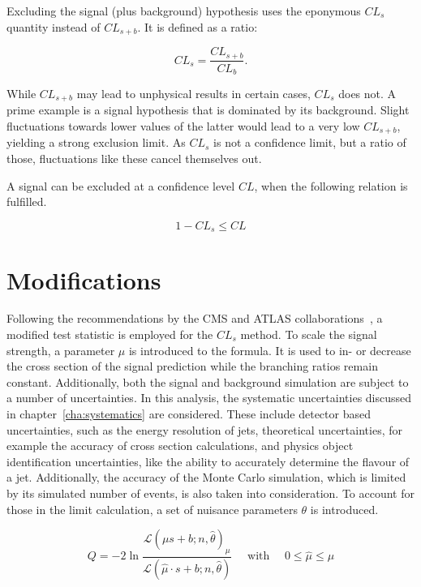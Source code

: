 Excluding the signal (plus background) hypothesis uses the eponymous $CL_s$ quantity instead of $CL_{s+b}$. It is defined as a ratio:

\begin{equation}
  \label{eq:cls}
  CL_s = \frac{CL_{s+b}}{CL_b}.
\end{equation}

\noindent While $CL_{s+b}$ may lead to unphysical results in certain cases, $CL_s$ does not. A prime example is a signal hypothesis that is dominated by its background. Slight fluctuations towards lower values of the latter would lead to a very low $CL_{s+b}$, yielding a strong exclusion limit. As $CL_s$ is not a confidence limit, but a ratio of those, fluctuations like these cancel themselves out.

A signal can be excluded at a confidence level $CL$, when the following relation is fulfilled.

\begin{equation}
  \label{eq:cl-excl}
  1 - CL_s \leq CL
\end{equation}

\section{Modifications}
\label{sec:mods}

Following the recommendations by the CMS and ATLAS collaborations~\cite{clsmod}, a modified test statistic is employed for the $CL_s$ method. To scale the signal strength, a parameter $\mu$ is introduced to the formula. It is used to in- or decrease the cross section of the signal prediction while the branching ratios remain constant. Additionally, both the signal and background simulation are subject to a number of uncertainties. In this analysis, the systematic uncertainties discussed in chapter~\ref{cha:systematics} are considered. These include detector based uncertainties, such as the energy resolution of jets, theoretical uncertainties, for example the accuracy of cross section calculations, and physics object identification uncertainties, like the ability to accurately determine the flavour of a jet. Additionally, the accuracy of the Monte Carlo simulation, which is limited by its simulated number of events, is also taken into consideration. To account for those in the limit calculation, a set of nuisance parameters $\theta$ is introduced.

\begin{equation}
  \label{eq:q-mod}
  Q = - 2 \ln{ \frac{\mathcal{L} (\mu s + b; n, \hat{\theta})_\mu }{ \mathcal{L} (\hat{\mu} \cdot s + b; n, \hat{\theta} )} } \quad \text{ with } \quad 0 \leq \hat{\mu} \leq \mu
\end{equation}

